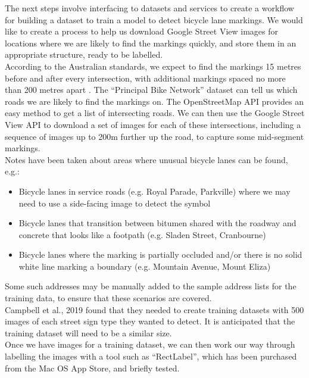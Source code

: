 \documentclass{article}
\begin{document}
The next steps involve interfacing to datasets and services to create a workflow for building a dataset to train a model to detect bicycle lane markings.  We would like to create a process to help us download Google Street View images for locations where we are likely to find the markings quickly, and store them in an appropriate structure, ready to be labelled. \\

According to the Australian standards, we expect to find the markings 15 metres before and after every intersection, with additional markings spaced no more than 200 metres apart \cite{as1742}.  The ``Principal Bike Network'' dataset can tell us which roads we are likely to find the markings on.  The OpenStreetMap API provides an easy method to get a list of intersecting roads.  We can then use the Google Street View API to download a set of images for each of these intersections, including a sequence of images up to 200m further up the road, to capture some mid-segment markings. \\

Notes have been taken about areas where unusual bicycle lanes can be found, e.g.:
\begin{itemize}
\item Bicycle lanes in service roads (e.g. Royal Parade, Parkville) where we may need to use a side-facing image to detect the symbol
\item Bicycle lanes that transition between bitumen shared with the roadway and concrete that looks like a footpath (e.g. Sladen Street, Cranbourne)
\item Bicycle lanes where the marking is partially occluded and/or there is no solid white line marking a boundary (e.g. Mountain Avenue, Mount Eliza)
\end{itemize}

Some such addresses may be manually added to the sample address lists for the training data, to ensure that these scenarios are covered. \\

Campbell et al., 2019 \cite{CAMPBELL2019101350} found that they needed to create training datasets with 500 images of each street sign type they wanted to detect.  It is anticipated that the training dataset will need to be a similar size. \\

Once we have images for a training dataset, we can then work our way through labelling the images with a tool such as ``RectLabel'', which has been purchased from the Mac OS App Store, and briefly tested. \\
\end{document}
